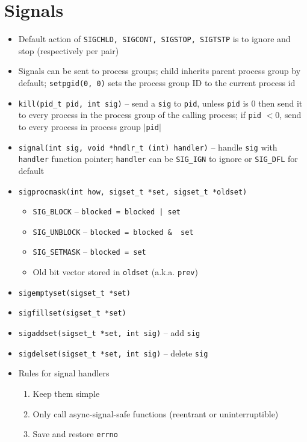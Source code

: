 \documentclass[twocolumn]{article}
\begin{document}
\section{Signals}
\begin{itemize}[noitemsep]
    \item Default action of \texttt{SIGCHLD, SIGCONT, SIGSTOP, SIGTSTP} is to ignore and stop (respectively per pair)
    \item Signals can be sent to process groups; child inherits parent process group by default; \texttt{setpgid(0, 0)} sets the process group ID to the current process id
    \item \texttt{kill(pid\_t pid, int sig)} -- send a \texttt{sig} to \texttt{pid}, unless \texttt{pid} is 0 then send it to every process in the process group of the calling process; if \texttt{pid} $< 0$, send to every process in process group $|$\texttt{pid}$|$
    \item \texttt{signal(int sig, void *hndlr\_t (int) handler)} -- handle \texttt{sig} with \texttt{handler} function pointer; \texttt{handler} can be \texttt{SIG\_IGN} to ignore or  \texttt{SIG\_DFL} for default
    \item \texttt{sigprocmask(int how, sigset\_t *set, sigset\_t *oldset)}
    \begin{itemize}[noitemsep]
        \item \texttt{SIG\_BLOCK} -- \texttt{blocked = blocked | set}
        \item \texttt{SIG\_UNBLOCK} -- \texttt{blocked = blocked \& ~set}
        \item \texttt{SIG\_SETMASK} -- \texttt{blocked = set}
        \item Old bit vector stored in \texttt{oldset} (a.k.a. \texttt{prev})
    \end{itemize}
    \item \texttt{sigemptyset(sigset\_t *set)}
    \item \texttt{sigfillset(sigset\_t *set)}
    \item \texttt{sigaddset(sigset\_t *set, int sig)} -- add \texttt{sig}
    \item \texttt{sigdelset(sigset\_t *set, int sig)} -- delete \texttt{sig}
    \item Rules for signal handlers
    \begin{enumerate}
        \item Keep them simple
        \item Only call async-signal-safe functions (reentrant or uninterruptible)
        \item Save and restore \texttt{errno}

\end{enumerate}
\end{itemize}
\end{document}

